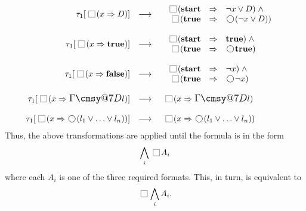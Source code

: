 \documentclass[nohyperref]{acmtrans2f}
\makeatletter
\def\sometime{\mathord{\hbox{\large$\mathchar"0\cmsy@7D$}}}
\newcommand{\always}{\raisebox{-.2ex}{
                           \mbox{\unitlength=0.9ex
                           \begin{picture}(2,2)
                           \linethickness{0.06ex}
                           \put(0,0){\line(1,0){2}}
                           \put(0,2){\line(1,0){2}}
                           \put(0,0){\line(0,1){2}}
                           \put(2,0){\line(0,1){2}}
                           \end{picture}}}
                          \,}
\newcommand{\next}{\!\raisebox{-.2ex}{ %
                        \mbox{\unitlength=0.9ex
                        \begin{picture}(2,2)
                        \linethickness{0.06ex}
                        \put(1,1){\circle{2}} %
                        \end{picture}}}       %
                        \,}
\let\imp=\Rightarrow
\def\ltrue{\hbox{\rm\bf true}}
\def\lfalse{\hbox{\rm\bf false}}
\def\lstart{\hbox{\rm\bf start}}
\makeatother
\begin{document}
$$
\begin{array}{rcll}
\tau_1[\always(x \imp D  )]
 & \longrightarrow  &
\begin{array}{rcl} 
\,\,\always(\lstart  & \imp & \neg x \lor D) \; \land \\
\always(\ltrue  & \imp & \next(\neg x \lor D)) 
\end{array} \\
\\
\tau_1[ \always(x \imp \ltrue  )]
 & \longrightarrow  &
\begin{array}{rcl} 
\,\,\always(\lstart  & \imp & \ltrue) \; \land \\
\always(\ltrue  & \imp & \next\ltrue) 
\end{array} & \\
\\
\tau_1[\always(x \imp \lfalse  )]
 & \longrightarrow  &
\begin{array}{rcl} 
\,\,\always(\lstart  & \imp & \neg x) \; \land \\
\always(\ltrue  & \imp & \next\neg x) 
\end{array} & \\
\\
\tau_1[\always(x \imp \sometime l  )]
 & \longrightarrow  &
\,\,\always(x  \imp \sometime l) \\
\\
\tau_1[\always(x \imp \next(l_1 \lor \ldots \lor l_n ))]
 & \longrightarrow  &
\,\,\always(x  \imp \next(l_1 \lor \ldots \lor l_n )) \\
\end{array}
$$
Thus, the above transformations are applied until the formula is in
the form 
$$
\bigwedge_i \always A_i
$$
where each $A_i$ is one of the three required formats. This, in turn,
is equivalent to
$$
\always \bigwedge_i  A_i.
$$
\end{document}
